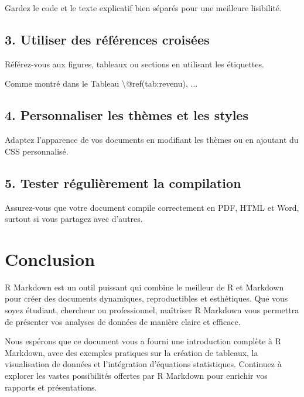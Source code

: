 \documentclass[
]{article}
\newenvironment{Shaded}{\begin{snugshade}}{\end{snugshade}}
\newcommand{\NormalTok}[1]{#1}
\begin{document}
Gardez le code et le texte explicatif bien séparés pour une meilleure
lisibilité.

\hypertarget{utiliser-des-ruxe9fuxe9rences-croisuxe9es}{%
\subsection{3. Utiliser des références
croisées}\label{utiliser-des-ruxe9fuxe9rences-croisuxe9es}}

Référez-vous aux figures, tableaux ou sections en utilisant les
étiquettes.

\begin{Shaded}
\begin{Highlighting}[]
\NormalTok{Comme montré dans le Tableau \textbackslash{}@ref(tab:revenu), ...}
\end{Highlighting}
\end{Shaded}

\hypertarget{personnaliser-les-thuxe8mes-et-les-styles}{%
\subsection{4. Personnaliser les thèmes et les
styles}\label{personnaliser-les-thuxe8mes-et-les-styles}}

Adaptez l'apparence de vos documents en modifiant les thèmes ou en
ajoutant du CSS personnalisé.

\hypertarget{tester-ruxe9guliuxe8rement-la-compilation}{%
\subsection{5. Tester régulièrement la
compilation}\label{tester-ruxe9guliuxe8rement-la-compilation}}

Assurez-vous que votre document compile correctement en PDF, HTML et
Word, surtout si vous partagez avec d'autres.

\hypertarget{conclusion}{%
\section{Conclusion}\label{conclusion}}

R Markdown est un outil puissant qui combine le meilleur de R et
Markdown pour créer des documents dynamiques, reproductibles et
esthétiques. Que vous soyez étudiant, chercheur ou professionnel,
maîtriser R Markdown vous permettra de présenter vos analyses de données
de manière claire et efficace.

Nous espérons que ce document vous a fourni une introduction complète à
R Markdown, avec des exemples pratiques sur la création de tableaux, la
visualisation de données et l'intégration d'équations statistiques.
Continuez à explorer les vastes possibilités offertes par R Markdown
pour enrichir vos rapports et présentations.
\end{document}
